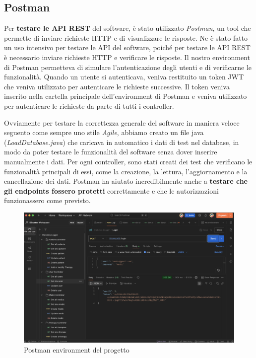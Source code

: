 \documentclass[a4paper]{article}
\begin{document}
\subsection{Postman}

Per \textbf{testare le API REST} del software, è stato utilizzato \textit{Postman}, un tool che permette di inviare richieste HTTP 
e di visualizzare le risposte. Ne è stato fatto un uso intensivo per testare le API del software,
poiché per testare le API REST è necessario inviare richieste HTTP e verificare le risposte.
Il nostro environment di Postman permetteva di simulare l'autenticazione degli utenti e di verificarne 
le funzionalità. Quando un utente si autenticava, veniva restituito un token JWT che veniva utilizzato per
autenticare le richieste successive. Il token veniva inserito nella cartella principale
dell'environment di Postman e veniva utilizzato per autenticare le richieste da parte di tutti i controller.


\vspace{1em}
\noindent
Ovviamente per testare la correttezza generale del software in maniera veloce seguento come sempre
uno stile \textit{Agile}, abbiamo creato un file java (\textit{LoadDatabase.java}) che caricava in automatico i dati di test nel database,
in modo da poter testare le funzionalità del software senza dover inserire manualmente i dati.
Per ogni controller, sono stati creati dei test che verificano le funzionalità principali di essi, come 
la creazione, la lettura, l'aggiornamento e la cancellazione dei dati.
Postman ha aiutato incredibilmente anche a \textbf{testare che gli endpoints fossero protetti} correttamente e 
che le autorizzazioni funzionassero come previsto.

\begin{figure}[H]
  \begin{center}
    \includegraphics[width=1\textwidth]{postman.png}
  \end{center}
  \caption{Postman environment del progetto} 
  \label{fig:postman}
\end{figure}
\noindent
\end{document}
